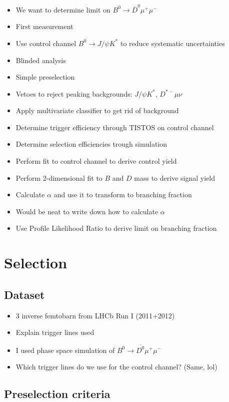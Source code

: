 \begin{itemize}
  \item We want to determine limit on $B^0\to \overline{D}^0μ^+μ^-$
  \item First measurement
  \item Use control channel $B^0\to J/ψ K^*$ to reduce systematic uncertainties
  \item Blinded analysis
  \item Simple preselection
  \item Vetoes to reject peaking backgrounds: $J/ψ K^*$, $D^{*-}μν$
  \item Apply multivariate classifier to get rid of background
  \item Determine trigger efficiency through TISTOS on control channel
  \item Determine selection efficiencies trough simulation
  \item Perform fit to control channel to derive control yield
  \item Perform 2-dimensional fit to $B$ and $D$ mass to derive signal yield
  \item Calculate $α$ and use it to transform to branching fraction
  \item Would be neat to write down how to calculate $α$
  \item Use Profile Likelihood Ratio to derive limit on branching fraction
\end{itemize}

\chapter{Selection} %

\section{Dataset}

\begin{itemize}
  \item 3 inverse femtobarn from LHCb Run I (2011+2012)
  \item Explain trigger lines used
  \item I used phase space simulation of $B^0\to\overline{D^0}μ^+μ^-$
  \item Which trigger lines do we use for the control channel? (Same, lol)
\end{itemize}

\section{Preselection criteria}

